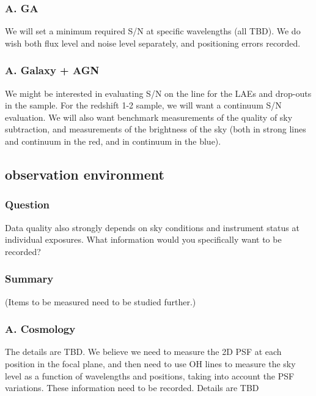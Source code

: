 \documentclass[a4paper,notitlepage]{article}
\begin{document}
\subsubsection{A. GA}
We will set a minimum required S/N at specific wavelengths (all
TBD). We do wish both flux level and noise level separately, and
positioning errors recorded.

\subsubsection{A. Galaxy + AGN}
We might be interested in evaluating S/N on the line for the LAEs and
drop-outs in the sample.  For the redshift 1-2 sample, we will want a
continuum S/N evaluation.  We will also want benchmark measurements 
of the quality of sky subtraction, and measurements of the brightness 
of the sky (both in strong lines and continuum in the red, and in continuum 
in the blue).



\subsection{observation environment}

\subsubsection{Question}
Data quality also strongly depends on sky conditions and
      instrument status at individual exposures. What information
      would you specifically want to be recorded?

\subsubsection{Summary}

(Items to be measured need to be studied further.)

\subsubsection{A. Cosmology}
The details are TBD. We believe we need to measure the 2D PSF at
each position in the focal plane, and then need to use OH lines to
measure the sky level as a function of wavelengths and positions,
taking into account the PSF variations. These information need to be
recorded. Details are TBD
\end{document}
